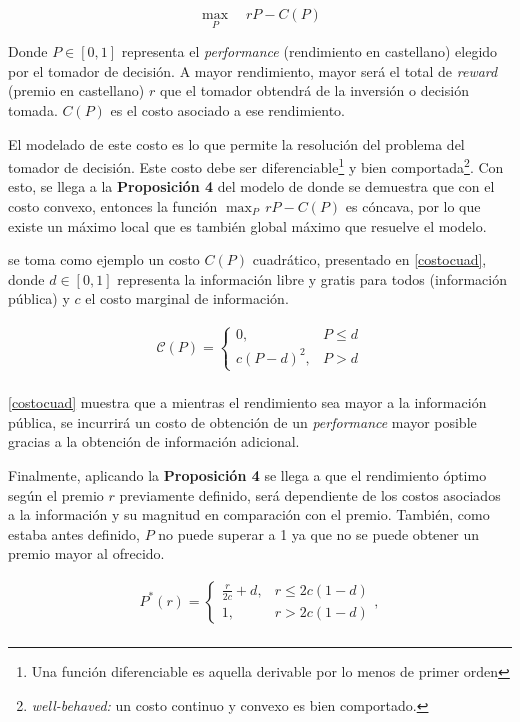 $$\max_{P}\quad rP-C(P)$$

Donde $P \in [0,1]$ representa el \textit{performance} (rendimiento en castellano) elegido por el tomador de decisión. A mayor rendimiento, mayor será el total de \textit{reward} (premio en castellano) $r$ que el tomador obtendrá de la inversión o decisión tomada. $C(P)$ es el costo asociado a ese rendimiento. 
\vspace{2.5mm}

El modelado de este costo es lo que permite la resolución del problema del tomador de decisión. Este costo debe ser diferenciable\footnote{Una función diferenciable es aquella derivable por lo menos de primer orden} y bien comportada\footnote{\textit{well-behaved:} un costo continuo y convexo es bien comportado. }. Con esto, se llega a la \textbf{Proposición 4} del modelo de  donde se demuestra que con el costo convexo, entonces la función $\max_{P}\, rP-C(P)$ es cóncava, por lo que existe un máximo local que es también global máximo que resuelve el modelo.
\vspace{2.5mm}

  se toma como ejemplo un costo $C(P)$ cuadrático, presentado en \ref{costocuad}, donde $d \in [0,1]$ representa la información libre y gratis para todos (información pública) y $c$ el costo marginal de información. 

\begin{equation}
\begin{array}{rrclcl}
    {\mathcal{C}}(P)=\begin{cases}0,&P\leq d\\c(P-d)^2,&P>d\end{cases}\label{costocuad}\\
\end{array}
\end{equation}
\vspace{2.5mm}

\ref{costocuad} muestra que a mientras el rendimiento sea mayor a la información pública, se incurrirá un costo de obtención de un \textit{performance} mayor posible gracias a la obtención de información adicional.
\vspace{2.5mm}

Finalmente, aplicando la \textbf{Proposición 4} se llega a que el rendimiento óptimo según el premio $r$ previamente definido, será dependiente de los costos asociados a la información y su magnitud en comparación con el premio. También, como estaba antes definido, $P$ no puede superar a 1 ya que no se puede obtener un premio mayor al ofrecido.

\begin{equation}
\begin{array}{rrclcl}
    P^*(r) = \begin{cases}\frac{r}{2c}+d,&r\leq 2c(1-d)\\1,&r>2c(1-d)\end{cases}, \label{perforopt}\\
\end{array}
\end{equation}





